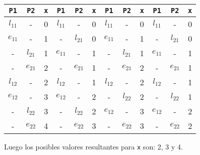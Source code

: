 \begin{ejercicio}
\begin{table}[H]
\centering
\begin{tabular}{|c|c|c||c|c|c||c|c|c||c|c|c|}
    \hline
    \verb|P1| & \verb|P2| & \verb|x| & \verb|P1| & \verb|P2| & \verb|x| & \verb|P1| & \verb|P2| & \verb|x| & \verb|P1| & \verb|P2| & \verb|x| \\
    \hline
    \hline
    $l_{11}$ & - & 0 & $l_{11}$ & - & 0 & $l_{11}$ & - & 0 & $l_{11}$ & - & 0 \\
    \hline
    $e_{11}$ & - & 1 & - & $l_{21}$ & 0 & $e_{11}$ & - & 1 & - & $l_{21}$ & 0 \\
    \hline
    - & $l_{21}$ & 1 & $e_{11}$ & - & 1 & - & $l_{21}$ & 1 & $e_{11}$ & - & 1 \\
    \hline
    - & $e_{21}$ & 2 & - & $e_{21}$ & 1 & - & $e_{21}$ & 2 & - & $e_{21}$ & 1 \\
    \hline
    $l_{12}$ & - & 2 & $l_{12}$ & - & 1 & $l_{12}$ & - & 2 & $l_{12}$ & - & 1 \\
    \hline
    $e_{12}$ & - & 3 & $e_{12}$ & - & 2 & - & $l_{22}$ & 2 & - & $l_{22}$ & 1 \\
    \hline
    - & $l_{22}$ & 3 & - & $l_{22}$ & 2 & $e_{12}$ & - & 3 & $e_{12}$ & - & 2 \\
    \hline
    - & $e_{22}$ & 4 & - & $e_{22}$ & 3 & - & $e_{22}$ & 3 & - & $e_{22}$ & 2  \\
    \hline
\end{tabular}
\end{table}

Luego los posibles valores resultantes para \verb|x| son: 2, 3 y 4.

\end{ejercicio}


